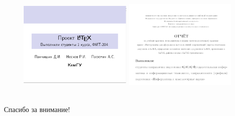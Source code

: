 \documentclass[russian, 14pt]{beamer}
\begin{document}
\begin{frame}
	\frametitle{\insertsection}
	\begin{figure}[h]
		\begin{center}
			\begin{minipage}[h]{0.4\linewidth}
				\includegraphics[width=5.5cm,height=5.5cm]{pr}
			\end{minipage}
			\hfill											
			\begin{minipage}[h]{0.4\linewidth}
				\includegraphics[width=5.5cm,height=5.5cm]{pr2}
			\end{minipage}
		\end{center}
	\end{figure}
\end{frame}

\begin{frame}
	\centering
	\LARGE{Спасибо за внимание!}
\end{frame}
\end{document}
